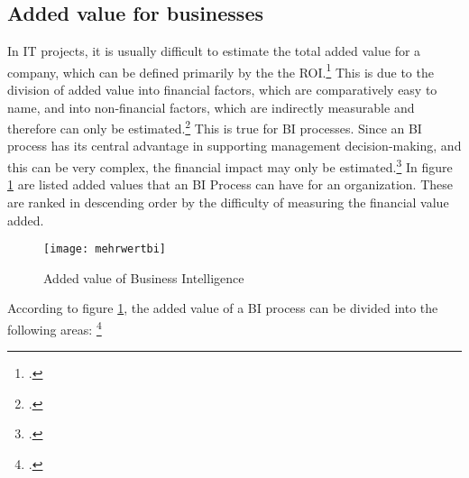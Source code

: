 \subsection{Added value for businesses} \label{toc:strategischermehrwert}

In IT projects, it is usually difficult to estimate the total added value for a company, which can be defined primarily by the
the \ac{ROI}.\footcite[Cf.][p. 97]{hovcevar2010assessing} This is due to the division of added value
into financial factors, which are comparatively easy to name, and into non-financial factors, which are indirectly measurable
and therefore can only be estimated.\footcite[Cf.][p. 93]{hovcevar2010assessing} This is true for \ac{BI} processes. Since an \ac{BI}
process has its central advantage in supporting management decision-making, and this can be very complex, the
financial impact may only be estimated.\footcite[Cf.][pp. 94]{hovcevar2010assessing} In figure
\ref{figure:mehrwertbi} are listed added values that an \ac{BI} Process can have for an organization. These are ranked in descending order
by the difficulty of measuring the financial value added.

\begin{figure}[H]
    \caption{Added value of Business Intelligence}
    \texttt{[image: mehrwertbi]}
    \label{figure:mehrwertbi}
    \\
    \cite[Source: Based on][Fig. 2]{watson2007current}
\end{figure}

According to figure \ref{figure:mehrwertbi}, the added value of a BI process can be divided into the following areas:
\footcite[Cf.][Fig. 2]{watson2007current}

